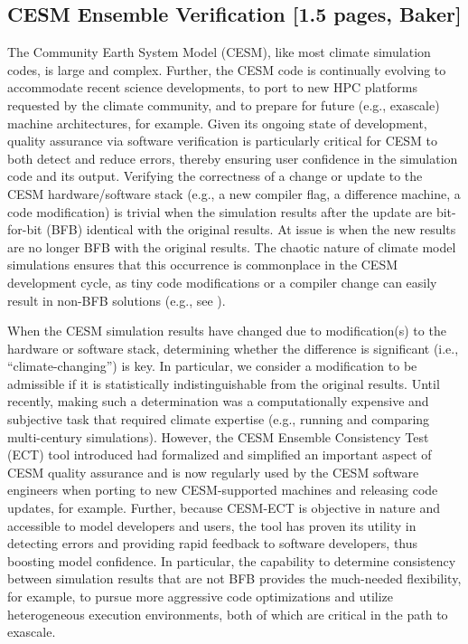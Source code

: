 \subsection{CESM Ensemble Verification [1.5 pages, Baker]}\label{sec:pycect}

The Community Earth System Model (CESM), like most climate simulation
codes, is large and complex.  Further, the CESM code is continually
evolving to accommodate recent science developments, to port to new
HPC platforms requested by the climate community, and to prepare for
future (e.g., exascale) machine architectures, for example. Given its
ongoing state of development, quality assurance via software
verification is particularly critical for CESM to both detect and
reduce errors, thereby ensuring user confidence in the simulation code
and its output. Verifying the correctness of a change or update to the
CESM hardware/software stack (e.g., a new compiler flag, a difference
machine, a code modification) is trivial when the simulation results
after the update are bit-for-bit (BFB) identical with the original
results.  At issue is when the new results are no longer BFB with the
original results.  The chaotic nature of climate model simulations ensures that this
occurrence is commonplace in the CESM development cycle, as tiny code
modifications or a compiler change can easily result in non-BFB solutions
(e.g., see \cite{milroy2016}).

When the CESM simulation results have changed due to modification(s)
to the hardware or software stack, determining whether the difference
is significant (i.e., ``climate-changing'') is key.  In particular, we
consider a modification to be admissible if it is statistically
indistinguishable from the original results.  Until recently, making
such a determination was a computationally expensive and subjective
task that required climate expertise (e.g., running and comparing
multi-century simulations).  However, the CESM Ensemble Consistency
Test (ECT) tool introduced \cite{baker2015} had formalized and
simplified an important aspect of CESM quality assurance and is now
regularly used by the CESM software engineers when porting to new
CESM-supported machines and releasing code updates, for
example. Further, because CESM-ECT is objective in nature and
accessible to model developers and users, the tool has proven its
utility in detecting errors and providing rapid feedback to software
developers, thus boosting model confidence.  In particular, the
capability to determine consistency between simulation results that
are not BFB provides the much-needed flexibility, for example, to
pursue more aggressive code optimizations and utilize heterogeneous
execution environments, both of which are critical in the path to
exascale.



